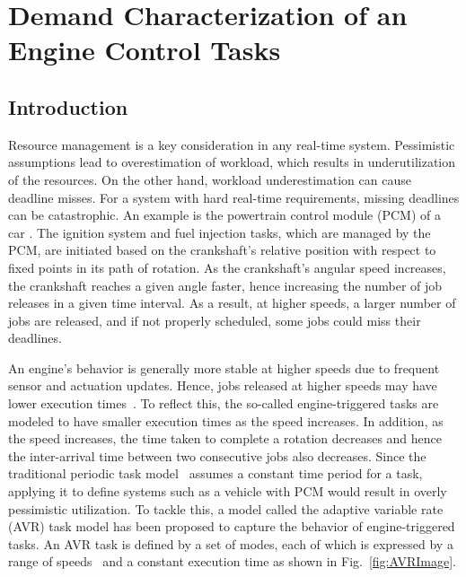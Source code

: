 \section{Demand Characterization of an Engine Control Tasks}   \label{chap:engCtrl}

\subsection{Introduction}

Resource management is a key consideration in any real-time system.
Pessimistic assumptions lead to overestimation of workload, which results in underutilization of the resources. On the other hand, workload underestimation can cause deadline misses.
For a system with hard real-time requirements, missing deadlines can be catastrophic.
An example is the powertrain control module (PCM) of a car \cite{noauthor_electricalelectronic_2008}. 
The ignition system and fuel injection tasks, which are managed by the PCM, are initiated based on the crankshaft's relative position with respect to fixed points in its path of rotation. 
As the crankshaft's angular speed increases, the crankshaft reaches a given angle faster, hence increasing the number of job releases in a given time interval.
As a result, at higher speeds, a larger number of jobs are released, and if not properly scheduled, some jobs could miss their deadlines.

An engine's behavior is generally more stable at higher speeds due to frequent sensor and actuation updates. Hence, jobs released at higher speeds may have lower execution times~\cite{dbuttle_real-time_nodate}.
To reflect this, the so-called engine-triggered tasks are modeled to have smaller execution times as the speed increases.
In addition, as the speed increases, the time taken to complete a rotation decreases and hence the inter-arrival time between two consecutive jobs also decreases.
Since the traditional periodic task model~\cite{liu_scheduling_1973} assumes a constant time period for a task, applying it to define systems such as a vehicle with PCM would result in overly pessimistic utilization.
To tackle this, a model called the adaptive variable rate (AVR) task model has been proposed to capture the behavior of engine-triggered tasks.
An AVR task is defined by a set of modes, each of which is expressed by a range of speeds~\cite{dbuttle_real-time_nodate} and a constant execution time as shown in Fig.~\ref{fig:AVRImage}.

